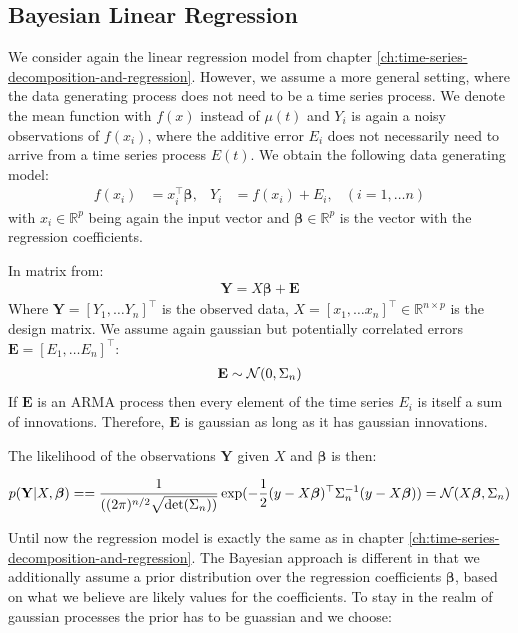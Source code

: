 \subsection{Bayesian Linear Regression}\label{subsec:bayesian-linear-regression}

We consider again the linear regression model from chapter \ref{ch:time-series-decomposition-and-regression}.
However, we assume a more general setting, where the data generating process does not need to be a time series process.
We denote the mean function with $f(x)$ instead of $\mu(t)$ and $Y_i$ is again a noisy observations of
$f(x_i)$, where the additive error $E_i$ does not necessarily need to arrive from a time series process $E(t)$.
We obtain the following data generating model:
\begin{align*}
    f(x_i) &= x_i^{\top}\boldsymbol{\beta}, & Y_i &= f(x_i) + E_i,  & (i = 1, \dots n)
\end{align*}
with $x_i \in \mathbb{R}^p$ being again the input vector and $\boldsymbol{\beta} \in \mathbb{R}^p$ is the vector with
the regression coefficients.

In matrix from:
\begin{align*}
    \mathbf{Y} = X \boldsymbol{\beta} + \mathbf{E}
\end{align*}
Where $\mathbf{Y} = [Y_{1}, \dots Y_{n}]^{\top}$ is the observed data,
$X = [x_{1}, \dots x_{n}]^{\top} \in \mathbb{R}^{n \times p}$ is the design matrix.
We assume again gaussian but potentially correlated errors $\mathbf{E} = [E_{1}, \dots E_{n}]^{\top}$:
\begin{gather*}
    \mathbf{E} \sim \operatorname{\mathcal{N}}(0, \Sigma_n)
\end{gather*}
If $\mathbf{E}$ is an ARMA process then every element of the time series $E_{i}$
is itself a sum of innovations. Therefore, $\mathbf{E}$ is gaussian as long as it has
gaussian innovations.

The likelihood of the observations $\mathbf{Y}$ given $X$ and $\boldsymbol{\beta}$ is then:

\begin{gather*}
    p(\mathbf{Y}|X,\boldsymbol{\beta}) =
    = \frac{1}{( (2\pi)^{n/2} \sqrt {\det(\Sigma_n))}}
    \exp(-\frac{1}{2}(y - X\boldsymbol{\beta})^{\top} \Sigma_n^{-1}(y-X\boldsymbol{\beta}))
    = \operatorname{\mathcal{N}}(X \boldsymbol{\beta}, \Sigma_n)
\end{gather*}

Until now the regression model is exactly the same as in chapter \ref{ch:time-series-decomposition-and-regression}.
The Bayesian approach is different in that we additionally assume a prior distribution over the
regression coefficients $\boldsymbol{\beta}$, based on what we believe are likely values for the coefficients.
To stay in the realm of gaussian processes the prior has to be guassian and we choose:

